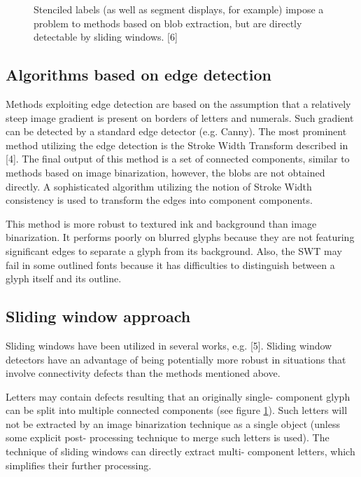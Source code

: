 \documentclass[12pt,a4paper]{report}
\begin{document}
\begin{figure}[htbp]
    \centering
    \caption{Stenciled labels (as well as segment displays, for example) impose a problem to methods based on blob extraction, but are directly detectable by sliding windows. [6]}
    \label{fig:stenciled}
\end{figure}

\subsection{Algorithms based on edge detection}
Methods exploiting edge detection are based on the assumption that a relatively steep image gradient is present on borders of letters and numerals. Such gradient can be detected by a standard edge detector (e.g. Canny). The most prominent method utilizing the edge detection is the Stroke Width Transform described in [4]. The final output of this method is a set of connected components, similar to methods based on image binarization, however, the blobs are not obtained directly. A sophisticated algorithm utilizing the notion of Stroke Width consistency is used to transform the edges into component components.

This method is more robust to textured ink and background than image binarization. It performs poorly on blurred glyphs because they are not featuring significant edges to separate a glyph from its background. Also, the SWT may fail in some outlined fonts because it has difficulties to distinguish between a glyph itself and its outline.

\subsection{Sliding window approach}
Sliding windows have been utilized in several works, e.g. [5]. Sliding window detectors have an advantage of being potentially more robust in situations that involve connectivity defects than the methods mentioned above.

Letters may contain defects resulting that an originally single- component glyph can be split into multiple connected components (see figure \ref{fig:stenciled}). Such letters will not be extracted by an image binarization technique as a single object (unless some explicit post- processing technique to merge such letters is used). The technique of sliding windows can directly extract multi- component letters, which simplifies their further processing.
\end{document}
